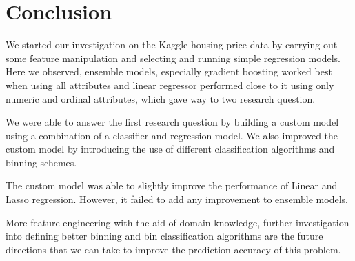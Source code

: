 \documentclass[conference,compsoc]{IEEEtran}
\begin{document}
\section {Conclusion}
We started our investigation on the Kaggle housing price data by carrying out some feature manipulation and selecting and running simple regression models. Here we observed, ensemble models, especially gradient boosting worked best when using all attributes and linear regressor performed close to it using only numeric and ordinal attributes, which gave way to two research question.

\par
We were able to answer the first research question by building a custom model using a combination of a classifier and regression model. We also improved the custom model by introducing the use of different classification algorithms and binning schemes.

\par
The custom model was able to slightly improve the performance of Linear and Lasso regression. However, it failed to add any improvement to ensemble models.

\par
More feature engineering with the aid of domain knowledge, further investigation into defining better binning and bin classification algorithms are the future directions that we can take to improve the prediction accuracy of this problem.



%
%
\end{document}
